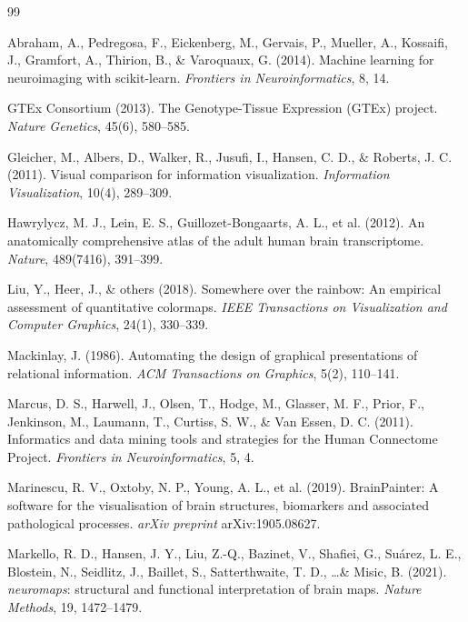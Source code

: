 \documentclass[11pt,letterpaper]{article}
\begin{document}

\begin{thebibliography}{99}

Abraham, A., Pedregosa, F., Eickenberg, M., Gervais, P., Mueller, A.,
Kossaifi, J., Gramfort, A., Thirion, B., \& Varoquaux, G. (2014).
Machine learning for neuroimaging with scikit-learn.
\textit{Frontiers in Neuroinformatics}, 8, 14.

GTEx Consortium (2013).
The Genotype-Tissue Expression (GTEx) project.
\textit{Nature Genetics}, 45(6), 580--585.

Gleicher, M., Albers, D., Walker, R., Jusufi, I., Hansen, C. D., \&
Roberts, J. C. (2011).
Visual comparison for information visualization.
\textit{Information Visualization}, 10(4), 289--309.

Hawrylycz, M. J., Lein, E. S., Guillozet-Bongaarts, A. L., et al. (2012).
An anatomically comprehensive atlas of the adult human brain transcriptome.
\textit{Nature}, 489(7416), 391--399.

Liu, Y., Heer, J., \& others (2018).
Somewhere over the rainbow: An empirical assessment of quantitative
colormaps. \textit{IEEE Transactions on Visualization and Computer
Graphics}, 24(1), 330--339.

Mackinlay, J. (1986).
Automating the design of graphical presentations of relational information.
\textit{ACM Transactions on Graphics}, 5(2), 110--141.

Marcus, D. S., Harwell, J., Olsen, T., Hodge, M., Glasser, M. F.,
Prior, F., Jenkinson, M., Laumann, T., Curtiss, S. W., \& Van Essen, D. C.
(2011). Informatics and data mining tools and strategies for the
Human Connectome Project.
\textit{Frontiers in Neuroinformatics}, 5, 4.

Marinescu, R. V., Oxtoby, N. P., Young, A. L., et al. (2019).
BrainPainter: A software for the visualisation of brain structures,
biomarkers and associated pathological processes.
\textit{arXiv preprint} arXiv:1905.08627.

Markello, R. D., Hansen, J. Y., Liu, Z.-Q., Bazinet, V., Shafiei, G.,
Suárez, L. E., Blostein, N., Seidlitz, J., Baillet, S., Satterthwaite,
T. D., \ldots \& Misic, B. (2021).
\textit{neuromaps}: structural and functional interpretation of brain maps.
\textit{Nature Methods}, 19, 1472--1479.


\end{thebibliography}
\end{document}
